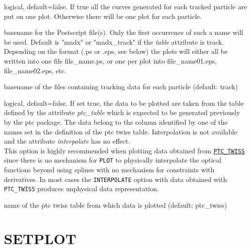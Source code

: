 \begin{madlist}
    logical, default=false. If true all the curves
     generated for each tracked particle are put on one plot. Otherwise
     there will be one plot for each particle.   

    basename for the Postscript
     file(s). Only the first occurrence of such a name will be
     used. Default is "madx" or "madx\_track" if the \textit{table}
     attribute is track.  Depending on the format (.ps or .eps, see
     below) the plots will either all be written into one file
     file\_name.ps, or one per plot into file\_name01.eps,
     file\_name02.eps, etc.   

    basename of the files containing
     tracking data for each particle (default: track)  

    logical, default=false. If set true, the data to be
     plotted are taken from the table defined by the attribute
     \textit{ptc\_table} which is expected to be generated previously by
     the ptc package. The data belong to the column identified by one of
     the names set in the definition of the ptc twiss
     table. Interpolation is not available and the attribute
     \textit{interpolate} has no effect. \\ 
     This option is highly recommended when plotting data obtained from
     \hyperref[chap:ptc_twiss]{\tt PTC\_TWISS} since there is no
     mechanism for {\tt PLOT} to physically interpolate the optical
     functions beyond using splines with no mechanism for constraints
     with derivatives. In most cases the {\tt INTERPOLATE} option with
     data obtained with {\tt PTC\_TWISS} produces unphysical data
     representation.

    name of the ptc twiss table from which data is
     plotted (default: ptc\_twiss)

\end{madlist}



\section{SETPLOT}
\label{sec:setplot}

